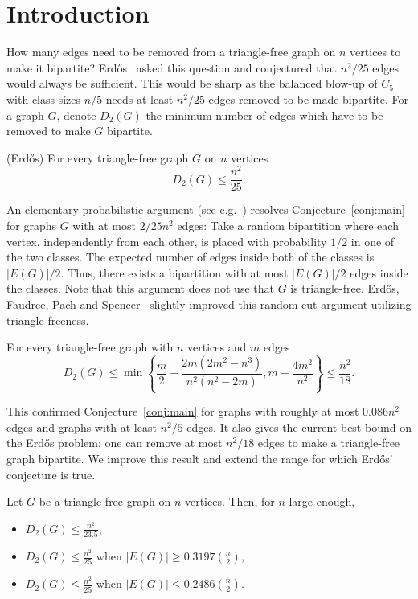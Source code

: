 \documentclass{svproc}
\begin{document}
\section{Introduction}
How many edges need to be removed from a triangle-free graph on $n$ vertices to make it bipartite? Erd\H{o}s~\cite{MR0409246} asked this question and conjectured that $n^2/25$ edges would always be sufficient. This would be sharp as the balanced blow-up of $C_5$ with class sizes $n/5$ needs at least $n^2/25$ edges removed to be made bipartite. For a graph $G$, denote $D_2(G)$ the minimum number of edges which have to be removed to make $G$ bipartite.
\begin{conjecture}{(Erd\H{o}s\cite{MR0409246})}
\label{conj:main}
For every triangle-free graph $G$ on $n$ vertices 
\begin{equation}
    D_2(G)\leq \frac{n^2}{25}.
\end{equation}
\end{conjecture}
An elementary probabilistic argument (see e.g.~\cite{Howmany}) resolves Conjecture~\ref{conj:main} for graphs $G$ with at most $2/25 n^2$ edges: Take a random bipartition where each vertex, independently from each other, is placed  with probability $1/2$ in one of the two classes. The expected number of edges inside both of the classes is $|E(G)|/2$. Thus, there exists a bipartition with at most $|E(G)|/2$ edges inside the classes. Note that this argument does not use that $G$ is triangle-free. Erd\H{o}s, Faudree, Pach and Spencer~\cite{Howtotriangle} slightly improved this random cut argument utilizing triangle-freeness.   
\begin{theorem}
\label{ErFaPaSp}
For every triangle-free graph with $n$ vertices and $m$ edges
\begin{equation}
    D_2(G)\leq \min \left\{\frac{m}{2}-\frac{2m(2m^2-n^3)}{n^2(n^2-2m)},m-\frac{4m^2}{n^2}   \right\} \leq \frac{n^2}{18}.
\end{equation}
\end{theorem}
This confirmed Conjecture~\ref{conj:main} for graphs with roughly at most $0.086 n^2$ edges and graphs with at least $n^2/5$ edges. It also gives the current best bound on the Erd\H{o}s problem; one can remove at most $n^2/18$ edges to make a triangle-free graph bipartite. We improve this result and extend the range for which Erd\H{o}s' conjecture is true. 
\begin{theorem}
\label{improvedtriangle}
Let $G$ be a triangle-free graph on $n$ vertices. Then, for $n$ large enough,
\begin{itemize}
    \item[(a)] $D_2(G)\leq \frac{n^2}{23.5},$
    \vspace{0.1cm}
    \item[(b)] $D_2(G) \leq \frac{n^2}{25}$ when  $|E(G)|\geq 0.3197 \binom{n}{2}$,  %
    \vspace{0.1cm}
   \item[(c)] $D_2(G) \leq \frac{n^2}{25}$ when   $|E(G)|\leq 0.2486 %
    \binom{n}{2}$.
\end{itemize}
\end{theorem}
\end{document}
